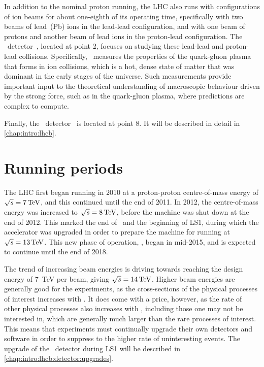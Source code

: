 In addition to the nominal proton running, the \ac{LHC} also runs with 
configurations of ion beams for about one-eighth of its operating time, 
specifically with two beams of lead~(Pb) ions in the lead-lead configuration, 
and with one beam of protons and another beam of lead ions in the proton-lead 
configuration.
The \alice\ detector~\cite{Aamodt:2008zz}, located at point 2, focuses on 
studying these lead-lead and proton-lead collisions.
Specifically, \alice\ measures the properties of the quark-gluon plasma that 
forms in ion collisions, which is a hot, dense state of matter that was 
dominant in the early stages of the universe.
Such measurements provide important input to the theoretical understanding of 
macroscopic behaviour driven by the strong force, such as in the quark-gluon 
plasma, where predictions are complex to compute.

Finally, the \lhcb\ detector~\cite{Alves:2008zz} is located at point 8.
It will be described in detail in \cref{chap:intro:lhcb}.

\section{Running periods}

The \ac{LHC} first began running in 2010 at a proton-proton centre-of-mass 
energy of $\sqrts = \SI{7}{\TeV}$, and this continued until the end of 2011.
In 2012, the centre-of-mass energy was increased to $\sqrts = \SI{8}{\TeV}$, 
before the machine was shut down at the end of 2012.
This marked the end of \runone\ and the beginning of \ac{LS1}, during which the 
accelerator was upgraded in order to prepare the machine for running at $\sqrts 
= \SI{13}{\TeV}$.
This new phase of operation, \runtwo, began in mid-2015, and is expected to 
continue until the end of 2018.

The trend of increasing beam energies is driving towards reaching the design 
energy of \SI{7}{\TeV} per beam, giving $\sqrts = \SI{14}{\TeV}$.
Higher beam energies are generally good for the experiments, as the 
cross-sections of the physical processes of interest increases with \sqrts.
It does come with a price, however, as the rate of other physical processes 
also increases with \sqrts, including those one may not be interested in, which 
are generally much larger than the rare processes of interest.
This means that experiments must continually upgrade their own detectors and 
software in order to suppress to the higher rate of uninteresting events.
The upgrade of the \lhcb\ detector during \ac{LS1} will be described in 
\cref{chap:intro:lhcb:detector:upgrades}.
